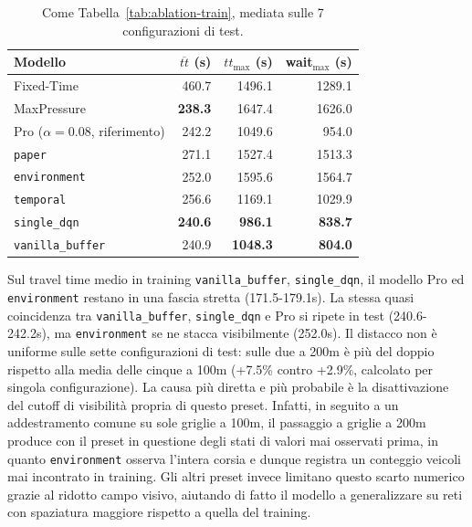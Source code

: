 \begin{table}[htbp]
  \centering
  \begin{tabular}{@{}lrrr@{}}
    \toprule
    Modello                          & $\overline{tt}$ (s) & $tt_{\max}$ (s) & wait$_{\max}$ (s) \\
    \midrule
    Fixed-Time                       & 460.7               & 1496.1          & 1289.1            \\
    MaxPressure                      & \textbf{238.3}      & 1647.4          & 1626.0            \\
    Pro ($\alpha=0.08$, riferimento) & 242.2               & 1049.6          & 954.0             \\
    \texttt{paper}                   & 271.1               & 1527.4          & 1513.3            \\
    \texttt{environment}             & 252.0               & 1595.6          & 1564.7            \\
    \texttt{temporal}                & 256.6               & 1169.1          & 1029.9            \\
    \texttt{single\_dqn}             & \textbf{240.6}      & \textbf{986.1}  & \textbf{838.7}    \\
    \texttt{vanilla\_buffer}         & 240.9               & \textbf{1048.3} & \textbf{804.0}    \\
    \bottomrule
  \end{tabular}
  \caption{Come Tabella~\ref{tab:ablation-train}, mediata sulle 7
    configurazioni di test.}
  \label{tab:ablation-test}
\end{table}

Sul travel time medio in training \texttt{vanilla\_buffer},
\texttt{single\_dqn}, il modello Pro ed \texttt{environment} restano in
una fascia stretta (171.5-179.1s). La stessa quasi coincidenza tra
\texttt{vanilla\_buffer}, \texttt{single\_dqn} e Pro si ripete
in test (240.6-242.2s), ma \texttt{environment} se ne stacca visibilmente (252.0s).
Il distacco non è uniforme sulle
sette configurazioni di test: sulle due a 200m è più del doppio rispetto
alla media delle cinque a 100m (+7.5\% contro +2.9\%, calcolato per
singola configurazione). La causa più diretta e più probabile è la disattivazione del
cutoff di visibilità propria di questo preset. Infatti, in seguito a
un addestramento comune su sole griglie a 100m, il passaggio a griglie a 200m
produce con il preset in questione degli stati di valori mai osservati prima, in quanto
\texttt{environment} osserva l'intera corsia e dunque registra un conteggio veicoli mai incontrato in training.
Gli altri preset invece limitano questo scarto numerico grazie al ridotto campo visivo,
aiutando di fatto il modello a generalizzare su reti con spaziatura maggiore rispetto a quella del training.

